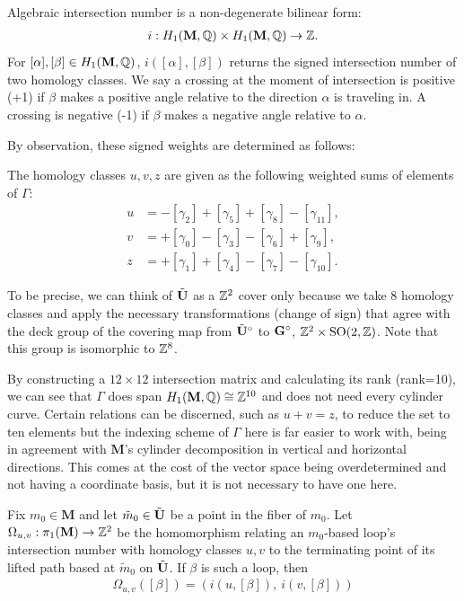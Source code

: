 \documentclass[]{article}
\def\bM{\mathbf{M}}
\def\btUs{\btU^\circ}
\def\mtild{\tilde{m}_0}
\def\SO{\mathrm{SO}}
\begin{document}
\begin{Def}
Algebraic intersection number is a non-degenerate bilinear form:
\begin{align*}
i:H_1(\bM,\QQ)\times H_1(\bM,\QQ)\rightarrow\ZZ.
\end{align*}
For $[\alpha],[\beta]\in H_1(\mathbf{M},\mathbb{Q})$, $i([\alpha],[\beta])$ returns the signed intersection number of two homology classes. We say a crossing at the moment of intersection is positive (+1) if $\beta$ makes a positive angle relative to the direction $\alpha$ is traveling in. A crossing is negative (-1) if $\beta$ makes a negative angle relative to $\alpha$.
\end{Def}

By observation, these signed weights are determined as follows:

\begin{Def}
The homology classes $u,v,z$ are given as the following weighted sums of elements of $\Gamma$:
\begin{align*}
u &= -[\gamma_2] +[\gamma_5] + [\gamma_8] - [\gamma_{11}],\\
v &= +[\gamma_0] -[\gamma_3] -[\gamma_6] +[\gamma_9],\\
z &= +[\gamma_1] +[\gamma_4]-[\gamma_7]-[\gamma_{10}].
\end{align*}
\end{Def}

\begin{rem}
To be precise, we can think of $\tilde{\mathbf{U}}$ as a $\mathbb{Z}^2$ cover only because we take 8 homology classes and apply the necessary transformations (change of sign) that agree with the deck group of the covering map from $\btUs$ to $\mathbf{G}^\circ$, $\ZZ^2\times\SO(2,\ZZ)$. Note that this group is isomorphic to $\mathbb{Z}^8$.
\end{rem}

By constructing a $12\times12$ intersection matrix and calculating its rank (rank=10), we can see that $\Gamma$ does span $H_1(\bM,\QQ)\cong\ZZ^{10}$ and does not need every cylinder curve. Certain relations can be discerned, such as $u+v=z$, to reduce the set to ten elements but the indexing scheme of $\Gamma$ here is far easier to work with, being in agreement with $\bM$'s cylinder decomposition in vertical and horizontal directions. This comes at the cost of the vector space being overdetermined and not having a coordinate basis, but it is not necessary to have one here.

\begin{Def}
Fix $m_0\in\bM$ and let $\mtild\in\btU$ be a point in the fiber of $m_0$. Let $\Omega_{u,v}:\pi_1(\bM)\rightarrow \ZZ^2$ be the homomorphism relating an $m_0$-based loop's intersection number with homology classes $u,v$ to the terminating point of its lifted path based at $\mtild$ on $\tilde{\mathbf{U}}$. If $\beta$ is such a loop, then 
\begin{align*}
\Omega_{u,v}([\beta])=(i(u,[\beta]),~i(v,[\beta]))
\end{align*}
\end{Def}
\end{document}
